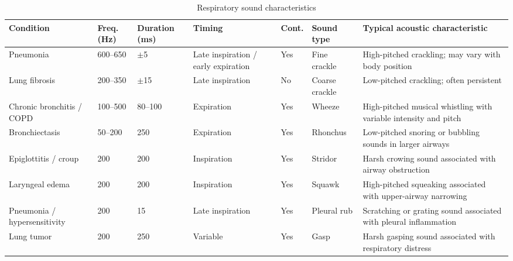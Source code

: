 \begin{table}[!t]
\centering
\caption{Respiratory sound characteristics}
\label{tab:resp_chars}
\footnotesize
\setlength{\tabcolsep}{3pt}
\renewcommand{\arraystretch}{1.12}
\begin{tabularx}{\textwidth}{@{}p{2.2cm}p{1.4cm}p{1.4cm}p{2.2cm}p{1.2cm}p{1.6cm}X@{}}
\toprule
\textbf{Condition} & \textbf{Freq. (Hz)} & \textbf{Duration (ms)} & \textbf{Timing} & \textbf{Cont.} & \textbf{Sound type} & \textbf{Typical acoustic characteristic} \\
\midrule
Pneumonia & 600--650 & $\pm$5 & Late inspiration / early expiration & Yes & Fine crackle & High-pitched crackling; may vary with body position \\
Lung fibrosis & 200--350 & $\pm$15 & Late inspiration & No & Coarse crackle & Low-pitched crackling; often persistent \\
Chronic bronchitis / COPD & 100--500 & 80--100 & Expiration & Yes & Wheeze & High-pitched musical whistling with variable intensity and pitch \\
Bronchiectasis & 50--200 & 250 & Expiration & Yes & Rhonchus & Low-pitched snoring or bubbling sounds in larger airways \\
Epiglottitis / croup & 200 & 200 & Inspiration & Yes & Stridor & Harsh crowing sound associated with airway obstruction \\
Laryngeal edema & 200 & 200 & Inspiration & Yes & Squawk & High-pitched squeaking associated with upper-airway narrowing \\
Pneumonia / hypersensitivity & 200 & 15 & Late inspiration & Yes & Pleural rub & Scratching or grating sound associated with pleural inflammation \\
Lung tumor & 200 & 250 & Variable & Yes & Gasp & Harsh gasping sound associated with respiratory distress \\
\bottomrule
\end{tabularx}
\end{table}
